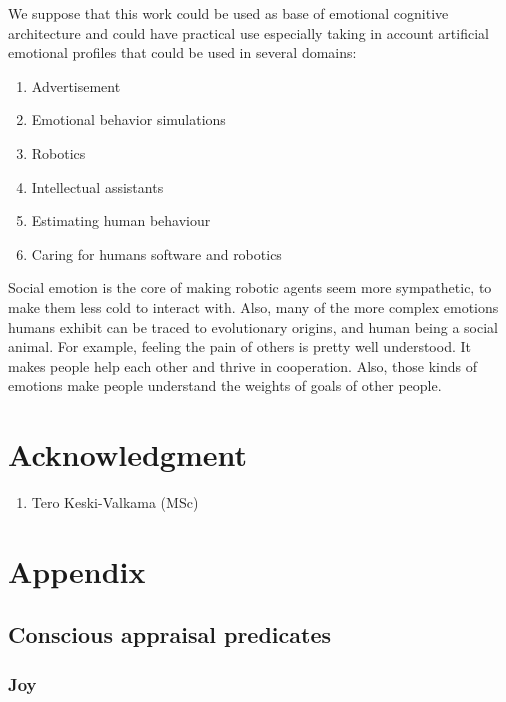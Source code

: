 We suppose that this work could be used as base of emotional cognitive architecture and could have practical use especially taking in account artificial emotional profiles that could be used in several domains:

\begin{enumerate}
 \item  Advertisement
 \item  Emotional behavior simulations
 \item  Robotics
 \item  Intellectual assistants
 \item  Estimating human behaviour
 \item  Caring for humans software and robotics
\end{enumerate}

Social emotion is the core of making robotic agents seem more sympathetic, to make them less cold to interact with.
Also, many of the more complex emotions humans exhibit can be traced to evolutionary origins, and human being a social animal.
For example, feeling the pain of others is pretty well understood. It makes people help each other and thrive in cooperation.
Also, those kinds of emotions make people understand the weights of goals of other people.

\section{Acknowledgment}

\begin{enumerate}
 \item Tero Keski-Valkama (MSc)
\end{enumerate}

\section{Appendix}

\subsection{Conscious appraisal predicates}

\subsubsection{Joy}

